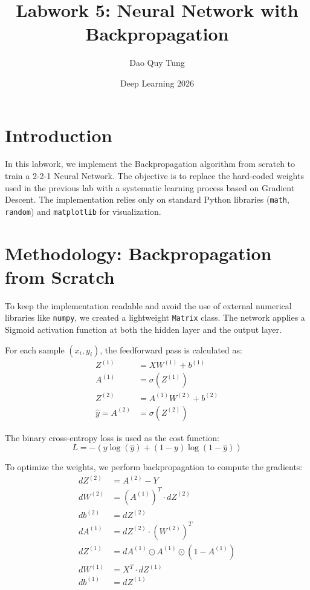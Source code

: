 \documentclass{article}
\title{Labwork 5: Neural Network with Backpropagation}
\author{Dao Quy Tung}
\date{Deep Learning 2026}
\begin{document}
\maketitle

\section{Introduction}
In this labwork, we implement the Backpropagation algorithm from scratch to train a 2-2-1 Neural Network. The objective is to replace the hard-coded weights used in the previous lab with a systematic learning process based on Gradient Descent. The implementation relies only on standard Python libraries (\texttt{math}, \texttt{random}) and \texttt{matplotlib} for visualization.

\section{Methodology: Backpropagation from Scratch}
To keep the implementation readable and avoid the use of external numerical libraries like \texttt{numpy}, we created a lightweight \texttt{Matrix} class. The network applies a Sigmoid activation function at both the hidden layer and the output layer. 

For each sample $(x_i, y_i)$, the feedforward pass is calculated as:
\begin{align*}
    Z^{(1)} &= X W^{(1)} + b^{(1)} \\
    A^{(1)} &= \sigma(Z^{(1)}) \\
    Z^{(2)} &= A^{(1)} W^{(2)} + b^{(2)} \\
    \hat{y} = A^{(2)} &= \sigma(Z^{(2)})
\end{align*}

The binary cross-entropy loss is used as the cost function:
\[ L = -\left(y \log(\hat{y}) + (1 - y) \log(1 - \hat{y})\right) \]

To optimize the weights, we perform backpropagation to compute the gradients:
\begin{align*}
    dZ^{(2)} &= A^{(2)} - Y \\
    dW^{(2)} &= (A^{(1)})^T \cdot dZ^{(2)} \\
    db^{(2)} &= dZ^{(2)} \\
    dA^{(1)} &= dZ^{(2)} \cdot (W^{(2)})^T \\
    dZ^{(1)} &= dA^{(1)} \odot A^{(1)} \odot (1 - A^{(1)}) \\
    dW^{(1)} &= X^T \cdot dZ^{(1)} \\
    db^{(1)} &= dZ^{(1)}
\end{align*}
\end{document}
